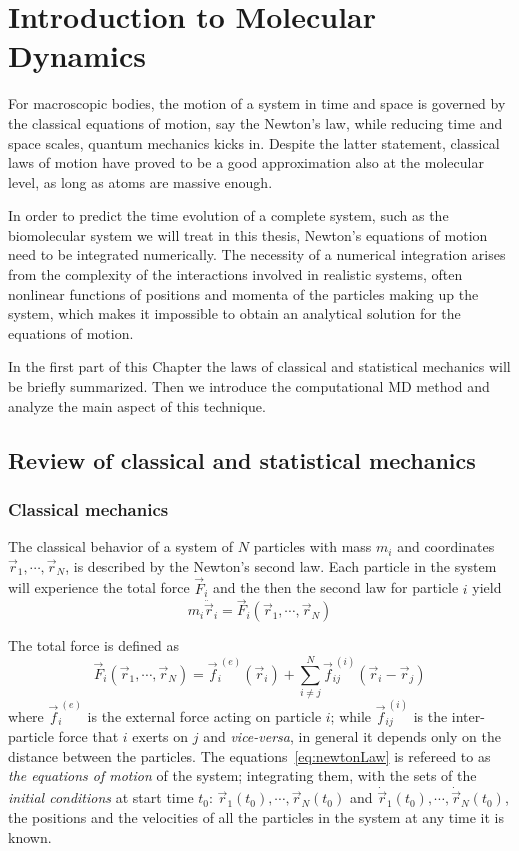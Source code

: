 \chapter{Introduction to Molecular Dynamics}
For macroscopic bodies, the motion of a system in time and space is governed by the classical equations of motion, say the Newton’s law, while reducing time and space scales, quantum mechanics kicks in. Despite the latter statement, classical laws of motion have proved to be a good approximation also at the molecular level, as long as atoms are massive enough.

In order to predict the time evolution of a complete system, such as the biomolecular system we will treat in this thesis, Newton’s equations of motion need to be integrated numerically. The necessity of a numerical integration arises from the complexity of the interactions involved in realistic systems, often nonlinear functions of positions and momenta of the particles making up the system, which makes it impossible to obtain an analytical solution for the equations of motion.

In the first part of this Chapter the laws of classical and statistical mechanics will be briefly summarized. Then we introduce the computational \ac{MD} method and analyze the main aspect of this technique.

\section{Review of classical and statistical mechanics}
\subsection{Classical mechanics}
The classical behavior of a system of $N$ particles with mass $m_i$ and coordinates $\vec r_1,\cdots,\vec r_N$, is described by the Newton's second law. Each particle in the system will experience the total force $\vec F_i$ and the then the second law for particle $i$ yield
\begin{equation}
	m_i \ddot{\vec{r}}_i = \vec F_i(\vec r_1,\cdots,\vec r_N)
	\label{eq:newtonLaw}
\end{equation}

The total force is defined as
\begin{equation}
	\vec F_i(\vec r_1,\cdots,\vec r_N) = \vec{f}_i^{\ (e)}(\vec r_i) + \sum_{i\ne j}^N \vec{f}_{ij}^{\ (i)}(\vec r_i - \vec r_j )
\end{equation}
where $\vec{f}_i^{\ (e)}$ is the external force acting on particle $i$; while $\vec{f}_{ij}^{\ (i)}$ is the inter-particle force that $i$ exerts on $j$ and \textit{vice-versa}, in general it depends only on the distance between the particles. The equations~\eqref{eq:newtonLaw} is refereed to as \textit{the equations of motion} of the system; integrating them, with the sets of the \textit{initial conditions} at start time $t_0$: $\vec r_1(t_0),\cdots,\vec r_N(t_0)$ and $\dot{\vec{r}}_1(t_0),\cdots,\dot{\vec{r}}_N(t_0)$, the positions and the velocities of all the particles in the system at any time it is known.

